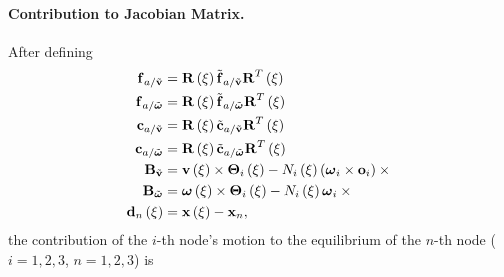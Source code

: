 \paragraph{Contribution to Jacobian Matrix.}
After defining
\begin{subequations}
\begin{align}
	\T{f}_{a/\tilde{\T{v}}} &= \TT{R}\plbr{\xi} \tilde{\T{f}}_{a/\tilde{\T{v}}} \TT{R}^T\plbr{\xi} \\
	\T{f}_{a/\tilde{\T{\omega}}} &= \TT{R}\plbr{\xi} \tilde{\T{f}}_{a/\tilde{\T{\omega}}} \TT{R}^T\plbr{\xi} \\
	\T{c}_{a/\tilde{\T{v}}} &= \TT{R}\plbr{\xi} \tilde{\T{c}}_{a/\tilde{\T{v}}} \TT{R}^T\plbr{\xi} \\
	\T{c}_{a/\tilde{\T{\omega}}} &= \TT{R}\plbr{\xi} \tilde{\T{c}}_{a/\tilde{\T{\omega}}} \TT{R}^T\plbr{\xi} \\
	\TT{B}_{\tilde{\T{v}}} &= \T{v}\plbr{\xi} \times \TT{\Theta}_i\plbr{\xi}
		- N_i\plbr{\xi} \plbr{\T{\omega}_i \times \T{o}_i} \times{} \\
	\TT{B}_{\tilde{\T{\omega}}} &= \T{\omega}\plbr{\xi} \times \TT{\Theta}_i\plbr{\xi}
		- N_i\plbr{\xi} \T{\omega}_i \times{} \\
	\T{d}_n\plbr{\xi} &= \T{x}\plbr{\xi} - \T{x}_n
	,
\end{align}
\end{subequations}
the contribution of the $i$-th node's motion to the equilibrium
of the $n$-th node ($i=1,2,3$, $n=1,2,3$) is

